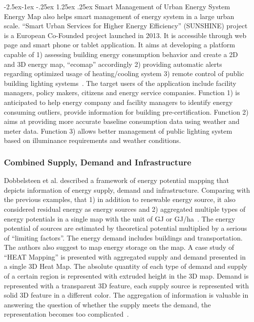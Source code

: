 \documentclass[hidelinks,12pt]{article}
\makeatletter
\renewcommand\paragraph{\@startsection{paragraph}{4}{\z@}%
            {-2.5ex\@plus -1ex \@minus -.25ex}%
            {1.25ex \@plus .25ex}%
            {\normalfont\normalsize\bfseries}}
\makeatother
\begin{document}
\paragraph{Smart Management of Urban Energy System}
Energy Map also helps smart management of energy system in a large
urban scale. ``Smart Urban Services for Higher Energy Efficiency''
(SUNSHINE) project is a European Co-Founded project launched in
2013. It is accessible through web page and smart phone or tablet
application. It aims at developing a platform capable of 1) assessing
building energy consumption behavior and create a 2D and 3D energy
map, ``ecomap'' accordingly 2) providing automatic alerts regarding
optimized usage of heating/cooling system 3) remote control of public
building lighting systems~\cite{SUNSHINE2015}. The target users of the
application include facility managers, policy makers, citizens and
energy service companies. Function 1) is anticipated to help energy
company and facility managers to identify energy consuming outliers,
provide information for building pre-certification. Function 2) aims
at providing more accurate baseline consumption data using weather and
meter data. Function 3) allows better management of public lighting
system based on illuminance requirements and weather conditions.

\subsubsection{Combined Supply, Demand and Infrastructure}
Dobbelsteen et al. described a framework of energy potential mapping
that depicts information of energy supply, demand and infrastructure.
Comparing with the previous examples, that 1) in addition to renewable
energy source, it also considered residual energy as energy sources
and 2) aggregated multiple types of energy potentials in a single map
with the unit of GJ or GJ/ha~\cite{Dobbelsteen2013}. The energy
potential of sources are estimated by theoretical potential multiplied
by a serious of ``limiting factors''. The energy demand includes
buildings and transportation. The authors also suggest to map energy
storage on the map. A case study of ``HEAT Mapping'' is presented with
aggregated supply and demand presented in a single 3D Heat Map. The
absolute quantity of each type of demand and supply of a certain
region is represented with extruded height in the 3D map. Demand is
represented with a transparent 3D feature, each supply source is
represented with solid 3D feature in a different color. The
aggregation of information is valuable in answering the question of
whether the supply meets the demand, the representation becomes too
complicated~\cite{Dobbelsteen2013}.
\end{document}
